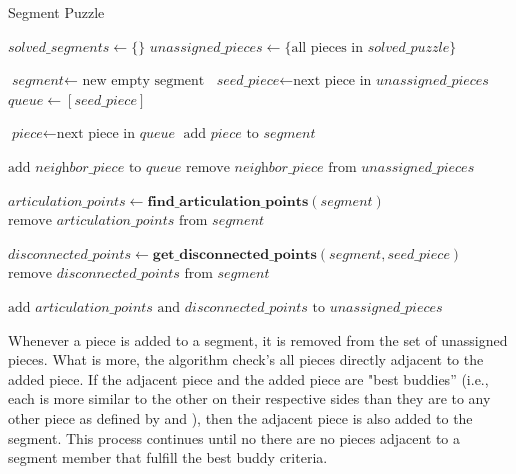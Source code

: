 \begin{algorithm}
\caption{Segment Puzzle}\label{alg:segmentPuzzle}
\begin{algorithmic}[1]
    \State $\textit{solved\_segments} \gets \{ \}$
    \State $\textit{unassigned\_pieces} \gets \{ \text{all pieces in } \textit{solved\_puzzle} \}$
\item[]
        \State $\textit{segment} \gets \text{ new empty segment}$
        \State $\textit{seed\_piece} \gets \text{next piece in } \textit{unassigned\_pieces}$
        \State $\textit{queue} \gets [\textit{seed\_piece}]$
\item[]
            \State $\textit{piece} \gets \text{next piece in }\textit{queue}$
            \State $\text{add } \textit{piece} \text{ to } \textit{segment}$
\item[]
            		\State $\text{add } \textit{neighbor\_piece} \text{ to } \textit{queue}$
            		\State $\text{remove } \textit{neighbor\_piece} \text{ from } \textit{unassigned\_pieces}$
            	\EndIf
            \EndFor
        \EndWhile
\item[]
        \State $\textit{articulation\_points} \gets \textbf{find\_articulation\_points}(\textit{segment})$
        \State $\text{remove } \textit{articulation\_points} \text{ from } \textit{segment}$
\item[]
		\State $\textit{disconnected\_points} \gets \textbf{get\_disconnected\_points}(\textit{segment},\textit{seed\_piece})$        
        \State $\text{remove } \textit{disconnected\_points} \text{ from } \textit{segment}$
\item[]
        \State $\text{add } \textit{articulation\_points} \text{ and } \textit{disconnected\_points} \text{ to } \textit{unassigned\_pieces}$
    \EndWhile
\EndProcedure
\end{algorithmic}
\end{algorithm}

Whenever a piece is added to a segment, it is removed from the set of unassigned pieces. What is more, the algorithm check's all pieces directly adjacent to the added piece.  If the adjacent piece and the added piece are "best buddies'' (i.e., each is more similar to the other on their respective sides than they are to any other piece as defined by \cite{pomeranz2011} and \cite{paikin2015}), then the adjacent piece is also added to the segment.  This process continues until no there are no pieces adjacent to a segment member that fulfill the best buddy criteria.

